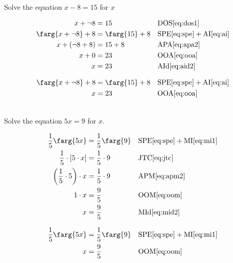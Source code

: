 \documentclass[20150903-160354-rs2.2-MarksMathNotebook.tex]{subfiles}
\begin{document}
\begin{example}[id:20141206-101107] \label{20141206-101107} \hfill \\

Solve the equation $x-8=15$ for $x$

\soln

\solnsteps
\begin{align*}
x+ \neg 8 &= 15  && \text{DOS} \eqref{eq:dos1} \\
\farg{x+ \neg 8} + 8  &= \farg{15} + 8  && \text{SPE} \eqref{eq:spe} + \text{AI} \eqref{eq:ai} \\
x + (\neg 8+ 8) &= 15 + 8  && \text{APA} \eqref{eq:apa2} \\
x + 0 &= 23  && \text{OOA} \eqref{eq:ooa} \\
x  &= 23  && \text{AId} \eqref{eq:aid2}
\end{align*}

\soln

\lesssteps
\begin{align*}
\farg{x+ \neg 8} + 8  &= \farg{15} + 8  && \text{SPE} \eqref{eq:spe} + \text{AI} \eqref{eq:ai} \\
x &= 23  && \text{OOA} \eqref{eq:ooa} \\
\end{align*}
\end{example}

\begin{example}[id:20141206-102404] \label{20141206-102404} \hfill \\

Solve the equation $5x=9$ for $x$.

\soln

\solnsteps
\begin{align*}
\dfrac{1}{5}\farg{5x} &= \dfrac{1}{5}\farg{9} && \text{SPE} \eqref{eq:spe} + \text{MI} \eqref{eq:mi1} \\
\dfrac{1}{5} \cdot \left[ 5 \cdot x \right] &= \dfrac{1}{5} \cdot 9 && \text{JTC} \eqref{eq:jtc} \\
\left(\dfrac{1}{5} \cdot 5 \right) \cdot x &= \dfrac{1}{5} \cdot 9  && \text{APM} \eqref{eq:apm2} \\
1\cdot x &= \dfrac{9}{5}  && \text{OOM} \eqref{eq:oom} \\
x &= \dfrac{9}{5}  && \text{MId} \eqref{eq:mid2}
\end{align*}

\soln

\lesssteps
\begin{align*}
\dfrac{1}{5}\farg{5x} &= \dfrac{1}{5}\farg{9} && \text{SPE} \eqref{eq:spe} + \text{MI} \eqref{eq:mi1} \\
x &= \dfrac{9}{5}  && \text{OOM} \eqref{eq:oom}
\end{align*}
\end{example}
\end{document}
